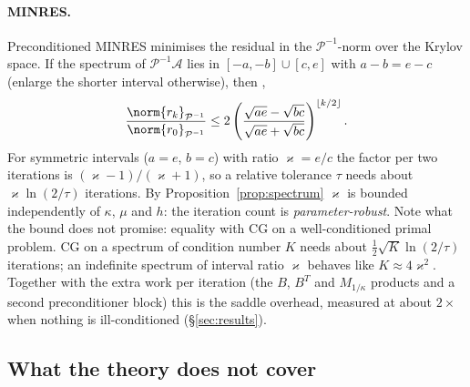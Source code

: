 \documentclass[11pt]{article}
\numberwithin{equation}{section}
\theoremstyle{remark}
\newcommand{\Mk}{M_{1/\kappa}}
\begin{document}
\paragraph{MINRES.} Preconditioned MINRES minimises the residual in the
$\mathcal P^{-1}$-norm over the Krylov space. If the spectrum of $\mathcal
P^{-1}\mathcal A$ lies in $[-a,-b]\cup[c,e]$ with $a-b = e-c$ (enlarge the
shorter interval otherwise), then \cite[Ch.~4]{ESW}, \cite[\S3.1]{Greenbaum1997}
\begin{equation}
  \frac{\norm{r_k}_{\mathcal P^{-1}}}{\norm{r_0}_{\mathcal P^{-1}}}\le
  2\left(\frac{\sqrt{ae} - \sqrt{bc}}{\sqrt{ae} + \sqrt{bc}}\right)^{\lfloor k/2\rfloor}.
  \label{eq:minres}
\end{equation}
For symmetric intervals ($a = e$, $b = c$) with ratio $\varkappa = e/c$ the
factor per two iterations is $(\varkappa - 1)/(\varkappa + 1)$, so a
relative tolerance $\tau$ needs about $\varkappa\ln(2/\tau)$ iterations.
By Proposition~\ref{prop:spectrum} $\varkappa$ is bounded independently of
$\kappa$, $\mu$ and $h$: the iteration count is \emph{parameter-robust}.
Note what the bound does not promise: equality with CG on a
well-conditioned primal problem. CG on a spectrum of condition number $K$
needs about $\frac12\sqrt K\ln(2/\tau)$ iterations; an indefinite spectrum
of interval ratio $\varkappa$ behaves like $K\approx4\varkappa^2$. Together
with the extra work per iteration (the $B$, $B^T$ and $\Mk$ products and a
second preconditioner block) this is the saddle overhead, measured at
about $2\times$ when nothing is ill-conditioned (\S\ref{sec:results}).

\subsection{What the theory does not cover}
\label{sec:inexact}
\end{document}
